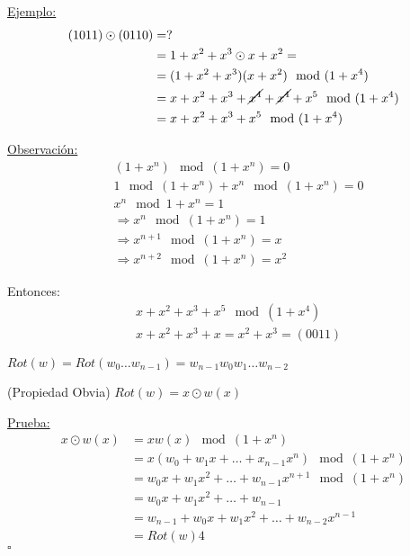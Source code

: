 \documentclass[12pt,a4paper]{article}
\begin{document}
\underline{Ejemplo:}
\begin{align*}
    (1011) \odot (0110) &= ?\\
    &= 1+x^{2}+x^{3} \odot x + x^{2} =\\
    &= (1+x^{2}+x^{3})(x+x^{2}) \mod (1+x^{4})\\
    &= x + x^{2} + x^{3} + \cancel{x^{4}} + \cancel{x^{4}} + x^{5} \mod (1+x^{4})\\
    &= x + x^{2} + x^{3} + x^{5} \mod (1+x^{4})\\
\end{align*}

\underline{Observación:}
\begin{align*}
    &(1+x^{n}) \mod (1+x^{n}) = 0\\
    &1 \mod (1+x^{n}) + x^{n} \mod (1+x^{n}) = 0\\
    &x^{n} \mod 1 + x^{n} =1\\
    &\Rightarrow x^{n} \mod (1+x^{n}) = 1\\
    &\Rightarrow x^{n+1} \mod (1+x^{n}) = x\\
    &\Rightarrow x^{n+2} \mod (1+x^{n}) = x^{2}
\end{align*}

Entonces:
\begin{align*}
    &x + x^{2} + x^{3} + x^{5} \mod (1+x^{4})\\
    &x + x^{2} + x^{3} + x = x^{2} + x^{3} = (0011)
\end{align*}

\begin{definition} $Rot(w) = Rot(w_{0}\ldots w_{n-1}) = w_{n-1}w_{0}w_{1}\ldots w_{n-2}$
\end{definition}

\begin{definition} (Propiedad Obvia) $Rot(w) = x \odot w(x)$
    \label{prop:obvia}
\end{definition}

\underline{Prueba:}
\begin{align*}
    x \odot w(x) &= x w(x) \mod (1+x^{n})\\
    &= x(w_{0}+w_{1}x + \ldots + x_{n-1}x^{n}) \mod (1+x^{n})\\
    &= w_{0}x + w_{1}x^{2} + \ldots + w_{n-1}x^{n+1} \mod (1+x^{n})\\
    &= w_{0}x + w_{1}x^{2} + \ldots + w_{n-1}\\
    &= w_{n-1} + w_{0}x + w_{1}x^{2} + \ldots + w_{n-2}x^{n-1}\\
    &= Rot(w)4
\end{align*} $\square$
\end{document}
